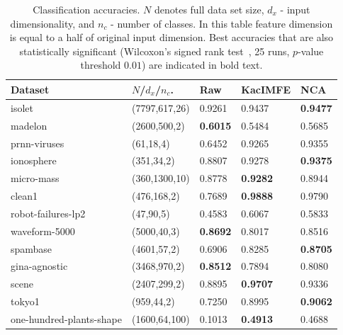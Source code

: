\documentclass{article}
\begin{document}
\begin{table}	
	\centering
	\begin{tabular}{ |p{3cm}|p{2.0cm}|p{1.2cm}|p{1.7cm}|p{1.2cm}|  }
		\hline
		Dataset & $N$/$d_{x}$/$n_{c}$. & Raw & KacIMFE & NCA  \\
		\hline
isolet & (7797,617,26)   &  0.9261  &  0.9437  &  \textbf{0.9477} \\
madelon & (2600,500,2)   &  \textbf{0.6015}  &  0.5484  &  0.5685 \\
prnn-viruses & (61,18,4)   &  0.6452  &  0.9265  &  0.9355 \\
ionosphere & (351,34,2)   &  0.8807  &  0.9278  &  \textbf{0.9375} \\
micro-mass & (360,1300,10)   &  0.8778  &  \textbf{0.9282}  &  0.8944 \\
clean1 & (476,168,2)   &  0.7689  &  \textbf{0.9888}  &  0.9790 \\
robot-failures-lp2 & (47,90,5)   &  0.4583  &  0.6067  &  0.5833 \\
waveform-5000 & (5000,40,3)   &  \textbf{0.8692}  &  0.8017  &  0.8516 \\
spambase & (4601,57,2)   &  0.6906  &  0.8285  &  \textbf{0.8705} \\
gina-agnostic & (3468,970,2)   &  \textbf{0.8512}  &  0.7894  &  0.8080 \\
scene & (2407,299,2)   &  0.8895  &  \textbf{0.9707}  &  0.9336 \\
tokyo1 & (959,44,2)   &  0.7250  &  0.8995  &  \textbf{0.9062} \\
one-hundred-plants-shape & (1600,64,100)   &  0.1013  &  \textbf{0.4913}  &  0.4688 \\		
		
		\hline
	\end{tabular}
	\caption{Classification accuracies. $N$ denotes full data set size, $d_{x}$ - input dimensionality, and $n_{c}$ - number of classes. In this table feature dimension is equal to a half of original input dimension. Best accuracies that are also statistically significant (Wilcoxon's signed rank test~\cite{Wilcoxon1992}, 25 runs, $p$-value threshold $0.01$) are indicated in bold text.}
	\label{table:classification_accuracies}	
\end{table}
\end{document}
